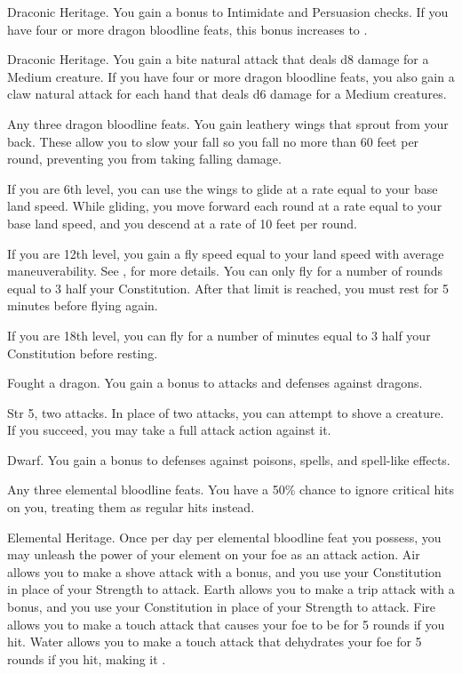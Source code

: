 \featpre Draconic Heritage.
\featben You gain a  bonus to Intimidate and Persuasion checks.
If you have four or more dragon bloodline feats, this bonus increases to .

\featpre Draconic Heritage.
\featben You gain a bite natural attack that deals d8 damage for a Medium creature.
If you have four or more dragon bloodline feats, you also gain a claw natural attack for each hand that deals d6 damage for a Medium creatures.

\featpre Any three dragon bloodline feats.
\featben You gain leathery wings that sprout from your back.
These allow you to slow your fall so you fall no more than 60 feet per round, preventing you from taking falling damage.

If you are 6th level, you can use the wings to glide at a rate equal to your base land speed.
While gliding, you move forward each round at a rate equal to your base land speed, and you descend at a rate of 10 feet per round.

If you are 12th level, you gain a fly speed equal to your land speed with average maneuverability.
See , for more details.
You can only fly for a number of rounds equal to 3 \add half your Constitution.
After that limit is reached, you must rest for 5 minutes before flying again.

If you are 18th level, you can fly for a number of minutes equal to 3 \add half your Constitution before resting.

\featpre Fought a dragon.
\featben You gain a  bonus to attacks and defenses against dragons.
\featspecial \featbanenotes

\featpres Str 5, two attacks.
\featben In place of two attacks, you can attempt to shove a creature.
If you succeed, you may take a full attack action against it.

\featpre Dwarf.
\featben You gain a  bonus to defenses against poisons, spells, and spell-like effects.

\featpre Any three elemental bloodline feats.
\featben You have a 50\% chance to ignore critical hits on you, treating them as regular hits instead.

\featpre Elemental Heritage.
\featben Once per day per elemental bloodline feat you possess, you may unleash the power of your element on your foe as an attack action.
Air allows you to make a shove attack with a  bonus, and you use your Constitution in place of your Strength to attack.
Earth allows you to make a trip attack with a  bonus, and you use your Constitution in place of your Strength to attack.
Fire allows you to make a touch attack that causes your foe to be \ignited for 5 rounds if you hit.
Water allows you to make a touch attack that dehydrates your foe for 5 rounds if you hit, making it \vulnerable.

